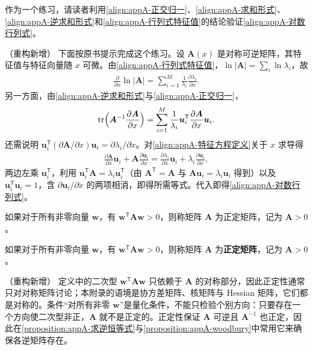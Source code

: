 \documentclass[../main.tex]{subfiles}
\begin{document}
作为一个练习，请读者利用\eqref{align:appA-正交归一}、\eqref{align:appA-求和形式}、\eqref{align:appA-逆求和形式}和\eqref{align:appA-行列式特征值}的结论验证\eqref{align:appA-对数行列式}。

\begin{remark}（重构新增）
下面按原书提示完成这个练习。设 $\bm{A}(x)$ 是对称可逆矩阵，其特征值与特征向量随 $x$ 可微。由\eqref{align:appA-行列式特征值}，$\ln|\bm{A}|=\sum_i\ln\lambda_i$，故
\begin{align*}
  \frac{\partial}{\partial x}\ln|\bm{A}|=\sum_{i=1}^{M}\frac{1}{\lambda_i}\frac{\partial\lambda_i}{\partial x}.
\end{align*}
另一方面，由\eqref{align:appA-逆求和形式}与\eqref{align:appA-正交归一}，
\begin{align*}
  \mathrm{tr}\Bigl(\bm{A}^{-1}\frac{\partial\bm{A}}{\partial x}\Bigr)=\sum_{i=1}^{M}\frac{1}{\lambda_i}\bm{u}_i^{\mathsf{T}}\frac{\partial\bm{A}}{\partial x}\bm{u}_i.
\end{align*}
还需说明 $\bm{u}_i^{\mathsf{T}}(\partial\bm{A}/\partial x)\bm{u}_i=\partial\lambda_i/\partial x$。对\eqref{align:appA-特征方程定义}关于 $x$ 求导得
\begin{align*}
  \frac{\partial\bm{A}}{\partial x}\bm{u}_i+\bm{A}\frac{\partial\bm{u}_i}{\partial x}=\frac{\partial\lambda_i}{\partial x}\bm{u}_i+\lambda_i\frac{\partial\bm{u}_i}{\partial x},
\end{align*}
两边左乘 $\bm{u}_i^{\mathsf{T}}$，利用 $\bm{u}_i^{\mathsf{T}}\bm{A}=\lambda_i\bm{u}_i^{\mathsf{T}}$（由 $\bm{A}^{\mathsf{T}}=\bm{A}$ 与 $\bm{A}\bm{u}_i=\lambda_i\bm{u}_i$ 得到）以及 $\bm{u}_i^{\mathsf{T}}\bm{u}_i=1$，含 $\partial\bm{u}_i/\partial x$ 的两项相消，即得所需等式。代入即得\eqref{align:appA-对数行列式}。
\end{remark}

如果对于所有非零向量 $\bm{w}$，有 $\bm{w}^{\mathsf{T}}\bm{A}\bm{w}>0$，则称矩阵 $\bm{A}$ 为正定矩阵，记为 $\bm{A}>0$。

\begin{definition}[正定矩阵]\label{definition:appA-正定矩阵}
如果对于所有非零向量 $\bm{w}$，有 $\bm{w}^{\mathsf{T}}\bm{A}\bm{w}>0$，则称矩阵 $\bm{A}$ 为\textbf{正定矩阵}，记为 $\bm{A}>0$。
\end{definition}

\begin{remark}（重构新增）
定义中的二次型 $\bm{w}^{\mathsf{T}}\bm{A}\bm{w}$ 只依赖于 $\bm{A}$ 的对称部分，因此正定性通常只对对称矩阵讨论；本附录的语境是协方差矩阵、核矩阵与 Hessian 矩阵，它们都是对称的。条件“对所有非零 $\bm{w}$”是量化条件，不能只检验个别方向：只要存在一个方向使二次型非正，$\bm{A}$ 就不是正定的。正定性保证 $\bm{A}$ 可逆且 $\bm{A}^{-1}$ 也正定，因此在\cref{proposition:appA-求逆恒等式}与\cref{proposition:appA-woodbury}中常用它来确保各逆矩阵存在。
\end{remark}
\end{document}
